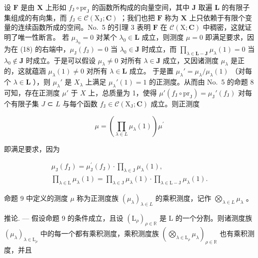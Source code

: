 设 \(\mathbf{F}\) 是由 \(\mathbf{X}\) 上形如 \(f_{\mathrm{J}} \circ \mathrm{pr}_{\mathrm{J}}\) 的函数所构成的向量空间，其中 \(\mathbf{J}\) 取遍 \(\mathbf{L}\) 的有限子集组成的有向集，而 \(f_{\mathrm{J}} \in \mathcal{C}(\mathrm{X}_{\mathrm{J}}; \mathbf{C})\) ；我们也把 \(\mathbf{F}\) 称为 \(\mathbf{X}\) 上只依赖于有限个变量的连续函数所成的空间。No.~5 的引理 3 表明 \(\mathbf{F}\) 在 \(\mathcal{C}(\mathrm{X}; \mathbf{C})\) 中稠密，这就证明了唯一性断言。 若 \(\mu_{\lambda_0} = 0\) 对某个 \(\lambda_0 \in \mathbf{L}\) 成立，则测度 \(\mu = 0\) 即满足要求，因为在 (18) 的右端中，\(\mu_{\mathrm{J}}(f_{\mathrm{J}}) = 0\) 当 \(\lambda_0 \in \mathbf{J}\) 时成立，而 \(\prod_{\lambda \in \mathbf{L} - \mathbf{J}} \mu_{\lambda}(1) = 0\) 当 \(\lambda_0 \notin \mathbf{J}\) 时成立。于是可以假设 \(\mu_{\lambda} \neq 0\) 对所有 \(\lambda \in \mathbf{J}\) 成立，又因诸测度 \(\mu_{\lambda}\) 是正的，这就蕴涵 \(\mu_{\lambda}(1) \neq 0\) 对所有 \(\lambda \in \mathbf{L}\) 成立。 于是置 \(\mu_{\lambda}' = \mu_{\lambda}/\mu_{\lambda}(1)\) （对每个 \(\lambda \in \mathbf{L}\) ），则 \(\mu_{\lambda}'\) 是 \(X_{\lambda}\) 上满足 \(\mu_{\lambda}'(1) = 1\) 的正测度。从而由 No.~5 的命题 8 可知，存在正测度 \(\mu'\) 于 \(X\) 上，总质量为 1，使得 \(\mu'(f_{\mathrm{J}} \circ \mathrm{pr}_{\mathrm{J}}) = \mu_{\mathrm{J}}'(f_{\mathrm{J}})\) 对每个有限子集 \(J\) ⊂ \(L\) 与每个函数 \(f_{\mathrm{J}} \in \mathcal{C}(\mathrm{X}_{\mathrm{J}}; \mathbf{C})\) 成立。则正测度

\[
\mu = \left(\prod_ {\lambda \in L} \mu_ {\lambda} (1)\right) \mu^ {\prime}
\]

即满足要求，因为

\[
\begin{array}{c} \mu_ {\mathrm{J}} (f _ {\mathrm{J}}) = \mu_ {\mathrm{J}} ^ {\prime} (f _ {\mathrm{J}}) \cdot \prod_ {\lambda \in \mathrm{J}} \mu_ {\lambda} (1), \\ \prod_ {\lambda \in \mathrm{L}} \mu_ {\lambda} (1) = \prod_ {\lambda \in \mathrm{J}} \mu_ {\lambda} (1) \cdot \prod_ {\lambda \in \mathrm{L} - \mathrm{J}} \mu_ {\lambda} (1). \end{array}
\]

命题 9 中定义的测度 \(\mu\) 称为正测度族 \((\mu_{\lambda})_{\lambda \in L}\) 的乘积测度，记作 \(\bigotimes_{\lambda \in L} \mu_{\lambda}\) 。

推论. --- 假设命题 9 的条件成立，且设 \((\mathrm{L}_{\rho})_{\rho\in\mathbb{R}}\) 是 L 的一个分割。则诸测度族 \((\mu_{\lambda})_{\lambda\in\mathrm{L}_{\rho}}\) 中的每一个都有乘积测度，乘积测度族 \(\left(\bigotimes_{\lambda\in\mathrm{L}_{\rho}}\mu_{\lambda}\right)_{\rho\in\mathbb{R}}\) 也有乘积测度，并且

